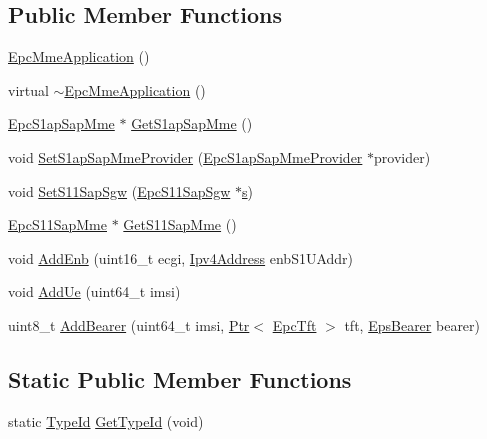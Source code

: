 \subsection*{Public Member Functions}
\begin{DoxyCompactItemize}
\item 
\hyperlink{classns3_1_1EpcMmeApplication_a03cc4f7aa1dad47e134aa6483bb5fb9a}{Epc\+Mme\+Application} ()
\item 
virtual \hyperlink{classns3_1_1EpcMmeApplication_a0e4b65ab1416790cd6a2d4c702750160}{$\sim$\+Epc\+Mme\+Application} ()
\item 
\hyperlink{classns3_1_1EpcS1apSapMme}{Epc\+S1ap\+Sap\+Mme} $\ast$ \hyperlink{classns3_1_1EpcMmeApplication_af8f71bb03ed0690bc1d1e5bb7bbefa6c}{Get\+S1ap\+Sap\+Mme} ()
\item 
void \hyperlink{classns3_1_1EpcMmeApplication_a5c386c595920ee57a4e301ba7a692baf}{Set\+S1ap\+Sap\+Mme\+Provider} (\hyperlink{classns3_1_1EpcS1apSapMmeProvider}{Epc\+S1ap\+Sap\+Mme\+Provider} $\ast$provider)
\item 
void \hyperlink{classns3_1_1EpcMmeApplication_af3a37bc948820809c5e270ef50a2b5ac}{Set\+S11\+Sap\+Sgw} (\hyperlink{classns3_1_1EpcS11SapSgw}{Epc\+S11\+Sap\+Sgw} $\ast$\hyperlink{generate__test__data__lte__sinr_8m_ad83eeb3a142285d1243a08c6b7026df8}{s})
\item 
\hyperlink{classns3_1_1EpcS11SapMme}{Epc\+S11\+Sap\+Mme} $\ast$ \hyperlink{classns3_1_1EpcMmeApplication_a69700dea221e69260cd2896544230654}{Get\+S11\+Sap\+Mme} ()
\item 
void \hyperlink{classns3_1_1EpcMmeApplication_a58560401f2314653cb41f5f8e97fee3a}{Add\+Enb} (uint16\+\_\+t ecgi, \hyperlink{classns3_1_1Ipv4Address}{Ipv4\+Address} enb\+S1\+U\+Addr)
\item 
void \hyperlink{classns3_1_1EpcMmeApplication_a0895d1a19f97350381cb7639ded9b60e}{Add\+Ue} (uint64\+\_\+t imsi)
\item 
uint8\+\_\+t \hyperlink{classns3_1_1EpcMmeApplication_aac5cd326c8ea841a3c7f50fbe5ffc466}{Add\+Bearer} (uint64\+\_\+t imsi, \hyperlink{classns3_1_1Ptr}{Ptr}$<$ \hyperlink{classns3_1_1EpcTft}{Epc\+Tft} $>$ tft, \hyperlink{structns3_1_1EpsBearer}{Eps\+Bearer} bearer)
\end{DoxyCompactItemize}
\subsection*{Static Public Member Functions}
\begin{DoxyCompactItemize}
\item 
static \hyperlink{classns3_1_1TypeId}{Type\+Id} \hyperlink{classns3_1_1EpcMmeApplication_a3d687a57753a0d35696ea17f6c14daed}{Get\+Type\+Id} (void)
\end{DoxyCompactItemize}
